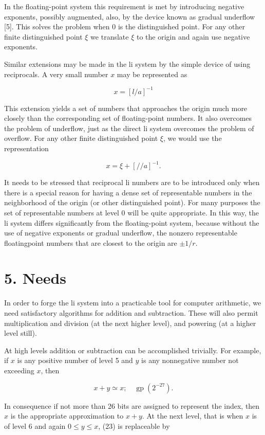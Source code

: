 \documentclass[10pt]{article}
\begin{document}
In the floating-point system this requirement is met by introducing negative exponents, possibly augmented, also, by the device known as gradual underflow [5]. This solves the problem when 0 is the distinguished point. For any other finite distinguished point $\xi$ we translate $\xi$ to the origin and again use negative exponents.

Similar extensions may be made in the li system by the simple device of using reciprocals. A very small number $x$ may be represented as

$$
x=[l / a]^{-1}
$$

This extension yields a set of numbers that approaches the origin much more closely than the corresponding set of floating-point numbers. It also overcomes the problem of underflow, just as the direct li system overcomes the problem of overflow. For any other finite distinguished point $\xi$, we would use the representation

$$
x=\xi+[/ / a]^{-1} .
$$

It needs to be stressed that reciprocal li numbers are to be introduced only when there is a special reason for having a dense set of representable numbers in the neighborhood of the origin (or other distinguished point). For many purposes the set of representable numbers at level 0 will be quite appropriate. In this way, the li system differs significantly from the floating-point system, because without the use of negative exponents or gradual underflow, the nonzero representable floatingpoint numbers that are closest to the origin are $\pm 1 / r$.

\section*{5. Needs}
In order to forge the li system into a practicable tool for computer arithmetic, we need satisfactory algorithms for addition and subtraction. These will also permit multiplication and division (at the next higher level), and powering (at a higher level still).

At high levels addition or subtraction can be accomplished trivially. For example, if $x$ is any positive number of level 5 and $y$ is any nonnegative number not exceeding $x$, then


\begin{equation*}
x+y \simeq x ; \quad \operatorname{gp}\left(2^{-27}\right) . \tag{23}
\end{equation*}


In consequence if not more than 26 bits are assigned to represent the index, then $x$ is the appropriate approximation to $x+y$. At the next level, that is when $x$ is of level 6 and again $0 \leq y \leq x$, (23) is replaceable by
\end{document}
